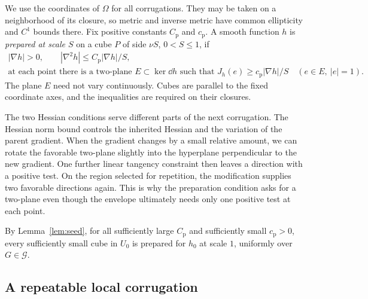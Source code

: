 We use the coordinates of $\Omega$ for all corrugations.  They may be
taken on a neighborhood of its closure, so metric and inverse metric
have common ellipticity and $C^1$ bounds there.  Fix positive constants
$C_{\mathrm p}$ and $c_{\mathrm p}$.  A smooth function $h$ is
\emph{prepared at scale $S$} on a cube $P$ of side $\nu S$,
$0<S\le1$, if
\begin{equation}\label{eq:preparation}
 \begin{gathered}
 |\nabla h|>0,\qquad
 |\nabla^2h|\le C_{\mathrm p}|\nabla h|/S,\\
 \text{at each point there is a two-plane }
 E\subset\ker\dd h\text{ such that }
 J_h(e)\ge c_{\mathrm p}|\nabla h|/S
 \quad(e\in E,\ |e|=1).
 \end{gathered}
\end{equation}
The plane $E$ need not vary continuously.  Cubes are parallel to the
fixed coordinate axes, and the inequalities are required on their
closures.

The two Hessian conditions serve different parts of the next corrugation.
The Hessian norm bound controls the inherited Hessian and the variation
of the parent gradient.  When the gradient changes by a small relative
amount, we can rotate the favorable two-plane slightly into the
hyperplane perpendicular to the new gradient.  One further linear
tangency constraint then leaves a direction with a positive test.
On the region selected for repetition, the modification supplies two
favorable directions again.  This is why the preparation condition
asks for a two-plane even though the envelope ultimately needs only one
positive test at each point.

By Lemma~\ref{lem:seed}, for all sufficiently large
$C_{\mathrm p}$ and sufficiently small $c_{\mathrm p}>0$, every
sufficiently small cube in $U_0$ is prepared for $h_0$ at scale $1$,
uniformly over $G\in\mathcal G$.

\subsection{A repeatable local corrugation}

